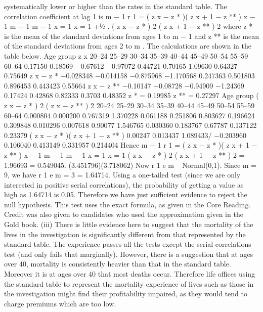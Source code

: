 \documentclass[a4paper,12pt]{article}
\begin{document}
systematically lower or higher than the rates in the standard table.
The correlation coefficient at lag 1 is
m − 1
r 1 =
\sum  ( z x − z * )( z x + 1 − z ** )
x − 1
m − 1 m − 1
x = 1 x = 1
+1⁄2
.
\sum  ( z x − z * ) 2 \sum  ( z x + 1 − z ** ) 2
where z * is the mean of the standard deviations from ages 1 to m − 1 and
z ** is the mean of the standard deviations from ages 2 to m .
The calculations are shown in the table below.
Age
group z x
20–24
25–29
30–34
35–39
40–44
45–49
50–54
55–59
60–64 0.17150
0.18569
−0.67612
−0.97072
0.44721
0.70165
1.09630
0.64327
0.75649
z x − z *
−0.028348
−0.014158
−0.875968
−1.170568
0.247363
0.501803
0.896453
0.443423
0.55664
z x − z **
−0.10147
−0.08728
−0.94909
−1.24369
0.17424
0.42868
0.82333
0.3703
0.48352
z * = 0.19985
z ** = 0.27297
Age
group ( z x − z * ) 2 ( z x − z ** ) 2
20–24
25–29
30–34
35–39
40–44
45–49
50–54
55–59
60–64 0.000804
0.000200
0.767319
1.370228
0.061188
0.251806
0.803627
0.196624
0.309848 0.010296
0.007618
0.90077
1.546765
0.030360
0.183767
0.67787
0.137122
0.23379
( z x − z * )( z x + 1 − z ** )
0.00247
0.013437
1.089433/
−0.203960
0.106040
0.413149
0.331957
0.214404
Hence
m − 1
r 1 =
\sum  ( z x − z * )( z x + 1 − z ** )
x − 1
m − 1 m − 1
x = 1 x = 1
\sum  ( z x − z * ) 2 \sum  ( z x + 1 − z ** ) 2
=
1.96693
= 0.549045.
(3.451796)(3.718062)
Now r 1 e m ~ Normal(0,1).
Since m = 9, we have r 1 e m = 3  = 1.64714.
Using a one-tailed test (since we are only interested in positive serial
correlations), the probability of getting a value as high as 1.64714 is 0.05.
Therefore we have just sufficient evidence to reject the null hypothesis.
This test uses the exact formula, as given in the Core Reading. Credit was
also given to candidates who used the approximation given in the Gold book.
(iii)
There is little evidence here to suggest that the mortality of the lives in the
investigation is significantly different from that represented by the standard
table.
The experience passes all the tests except the serial correlations test (and only
fails that marginally).
However, there is a suggestion that at ages over 40, mortality is consistently
heavier than that in the standard table.
Moreover it is at ages over 40 that most deaths occur.
Therefore life offices using the standard table to represent the mortality
experience of lives such as those in the investigation might find their
profitability impaired, as they would tend to charge premiums which are too
low.
\end{document}
